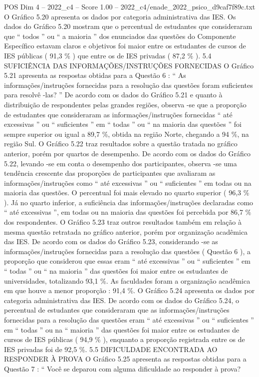 \begin{textsample}{POS Dim 4 – 2022\_c4 – Score 1.00 – 2022\_c4/enade\_2022\_psico\_d9caf7f89c.txt}
O Gráfico 5.20 apresenta os dados por categoria administrativa das IES.
Os dados do Gráfico 5.20 mostram que o percentual de estudantes que consideraram que “ todos ” ou “ a maioria ” dos enunciados das questões do Componente Específico estavam claros e objetivos foi maior entre os estudantes de cursos de IES públicas ( 91,3 \% ) que entre os de IES privadas ( 87,2 \% ). 5.4 SUFICIÊNCIA DAS INFORMAÇÕES/INSTRUÇÕES FORNECIDAS O Gráfico 5.21 apresenta as respostas obtidas para a Questão 6 : “ As informações/instruções fornecidas para a resolução das questões foram suficientes para resolvê -las? ” De acordo com os dados do Gráfico 5.21 e quanto à distribuição de respondentes pelas grandes regiões, observa -se que a proporção de estudantes que consideraram as informações/instruções fornecidas “ até excessivas ” ou “ suficientes ” em “ todas ” ou “ na maioria das questões ” foi sempre superior ou igual a 89,7 \%, obtida na região Norte, chegando a 94 \%, na região Sul.
O Gráfico 5.22 traz resultados sobre a questão tratada no gráfico anterior, porém por quartos de desempenho.
De acordo com os dados do Gráfico 5.22, levando -se em conta o desempenho dos participantes, observa -se uma tendência crescente das proporções de participantes que avaliaram as informações/instruções como “ até excessivas ” ou “ suficientes ” em todas ou na maioria das questões.
O percentual foi mais elevado no quarto superior ( 96,3 \% ).
Já no quarto inferior, a suficiência das informações/instruções declaradas como “ até excessivas ”, em todas ou na maioria das questões foi percebida por 86,7 \% dos respondentes.
O Gráfico 5.23 traz outros resultados também em relação à mesma questão retratada no gráfico anterior, porém por organização acadêmica das IES.
De acordo com os dados do Gráfico 5.23, considerando -se as informações/instruções fornecidas para a resolução das questões ( Questão 6 ), a proporção que considerou que essas eram “ até excessivas ” ou “ suficientes ” em “ todas ” ou “ na maioria ” das questões foi maior entre os estudantes de universidades, totalizando 93,1 \%.
As faculdades foram a organização acadêmica em que houve a menor proporção : 91,4 \%.
O Gráfico 5.24 apresenta os dados por categoria administrativa das IES.
De acordo com os dados do Gráfico 5.24, o percentual de estudantes que consideraram que as informações/instruções fornecidas para a resolução das questões eram “ até excessivas ” ou “ suficientes ” em “ todas ” ou na “ maioria ” das questões foi maior entre os estudantes de cursos de IES públicas ( 94,9 \% ), enquanto a proporção registrada entre os de IES privadas foi de 92,5 \%. 5.5 DIFICULDADE ENCONTRADA AO RESPONDER À PROVA O Gráfico 5.25 apresenta as respostas obtidas para a Questão 7 : “ Você se deparou com alguma dificuldade ao responder à prova?

\end{textsample}
